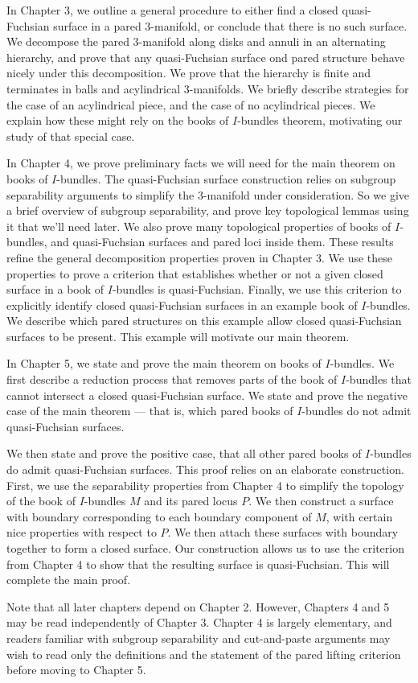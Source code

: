 In Chapter 3, we outline a general procedure to either find a closed
quasi-Fuchsian surface in a pared $3$-manifold, or conclude that there is no
such surface.  We decompose the pared $3$-manifold along disks and annuli in an
alternating hierarchy, and prove that any quasi-Fuchsian surface ond pared
structure behave nicely under this decomposition. We prove that the hierarchy
is finite and terminates in balls and acylindrical $3$-manifolds. We briefly
describe strategies for the case of an acylindrical piece, and the case of no
acylindrical pieces. We explain how these might rely on the books of
$I$-bundles theorem, motivating our study of that special case.

In Chapter 4, we prove preliminary facts we will need for the main theorem on
books of $I$-bundles. The quasi-Fuchsian surface construction relies on
subgroup separability arguments to simplify the $3$-manifold under
consideration.  So we give a brief overview of subgroup separability, and prove
key topological lemmas using it that we'll need later. We also prove many
topological properties of books of $I$-bundles, and quasi-Fuchsian surfaces and
pared loci inside them.  These results refine the general decomposition
properties proven in Chapter 3.  We use these properties to prove a criterion
that establishes whether or not a given closed surface in a book of $I$-bundles
is quasi-Fuchsian.  Finally, we use this criterion to explicitly identify
closed quasi-Fuchsian surfaces in an example book of $I$-bundles. We describe
which pared structures on this example allow closed quasi-Fuchsian surfaces to
be present. This example will motivate our main theorem.

In Chapter 5, we state and prove the main theorem on books of $I$-bundles. We
first describe a reduction process that removes parts of the book of
$I$-bundles that cannot intersect a closed quasi-Fuchsian surface. We state and
prove the negative case of the main theorem --- that is, which pared books of
$I$-bundles do not admit quasi-Fuchsian surfaces.

We then state and prove the positive case, that all other pared books of
$I$-bundles do admit quasi-Fuchsian surfaces. This proof relies on an elaborate
construction. First, we use the separability properties from Chapter 4 to
simplify the topology of the book of $I$-bundles $M$ and its pared locus $P$.
We then construct a surface with boundary corresponding to each boundary
component of $M$, with certain nice properties with respect to $P$. We then
attach these surfaces with boundary together to form a closed surface. Our
construction allows us to use the criterion from Chapter 4 to show that the
resulting surface is quasi-Fuchsian. This will complete the main proof.

Note that all later chapters depend on Chapter 2. However, Chapters 4 and 5 may
be read independently of Chapter 3. Chapter 4 is largely elementary, and
readers familiar with subgroup separability and cut-and-paste arguments may
wish to read only the definitions and the statement of the pared lifting
criterion before moving to Chapter 5.

